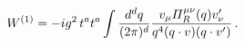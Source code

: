 \begin{equation}
W^{(1)} = - i g^2 \, t^a t^a
\int \frac{d^d q}{(2 \pi)^d}
\frac{v_\mu {\mit\Pi}_R^{\mu\nu} (q) v'_\nu}{q^4 (q \cdot v) (q \cdot v')}
\, .
\end{equation}

